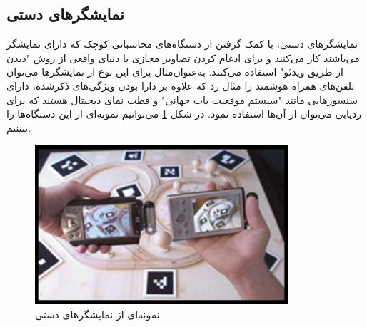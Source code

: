 \subsection{نمایشگرهای دستی}
نمایشگرهای دستی، با کمک گرفتن از دستگاه‌های محاسباتی کوچک که دارای نمایشگر می‌باشند کار می‌کنند و برای ادغام کردن تصاویر مجازی با دنیای واقعی از روش "دیدن از طریق ویدئو" استفاده می‌کنند. به‌عنوان‌مثال برای این نوع از نمایشگرها می‌توان تلفن‌های  همراه هوشمند را مثال زد که علاوه بر دارا بودن ویژگی‌های ذکرشده، دارای سنسورهایی مانند "سیستم موقعیت یاب جهانی" و قطب نمای دیجیتال هستند که برای ردیابی می‌توان از آن‌ها استفاده نمود. در شکل \ref{fig:mobile} می‌توانیم نمونه‌ای از این دستگاه‌ها را ببینیم.

\begin{figure}[tb]
	\centering
	\includegraphics[width=0.7\linewidth]{image/mobile}
	\caption {نمونه‌ای از نمایشگرهای دستی\cite{Julie}}
	\label{fig:mobile}
\end{figure}
